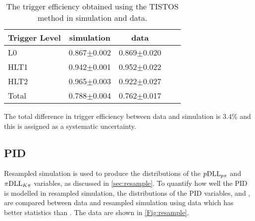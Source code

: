 \begin{table}[ht]
  \centering
  \begin{tabular}{l c c c c}
    \hline
    Trigger Level & simulation & data \\
    \hline
    L0 &   0.867$\pm$0.002 & 0.869$\pm$0.020\\
    HLT1 &  0.942$\pm$0.001 & 0.952$\pm$0.022\\
    HLT2 &   0.965$\pm$0.003 & 0.922$\pm$0.027\\
    \hline
     Total &   0.788$\pm$0.004 & 0.762$\pm$0.017\\
     \hline
  \end{tabular}
  \caption{The trigger efficiency obtained using the TISTOS method in simulation and data.}
  \label{Tab:tistos}
\end{table}


The total difference in trigger efficiency between data and simulation is 3.4\% and this is assigned as a systematic uncertainty. %
\subsection{PID}
\label{sec:pidsys}
Resampled simulation is used to produce the distributions of the $p\mathrm{DLL}_{{p}{\pi}}$ and $\pi\mathrm{DLL}_{{K}{\pi}}$ variables, as discussed in \autoref{sec:resample}. To quantify how well the PID is modelled in resampled simulation, the distributions of the PID variables, \dllppi and \dllkpi, are compared between data and resampled simulation using \LbKjpsi data which has better statistics than \Lbpijpsi. The data are shown in \autoref{Fig:resample}. %

